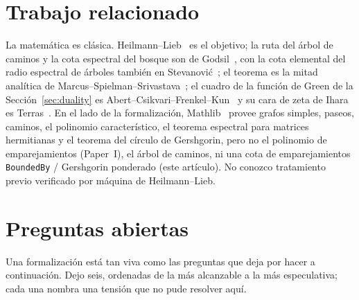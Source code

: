 \documentclass[11pt]{article}
\newcommand{\lean}[1]{{\def\_{\textunderscore\allowbreak}\texttt{#1}}}
\begin{document}
\section{Trabajo relacionado}
\label{sec:related}

La matem\'atica es cl\'asica. Heilmann--Lieb~\cite{HeilmannLieb1972} es el objetivo;
la ruta del \'arbol de caminos y la cota espectral del bosque son de
Godsil~\cite{Godsil1981Matchings,Godsil1993}, con la cota elemental del radio
espectral de \'arboles tambi\'en en Stevanovi\'c~\cite{Stevanovic2003}; el teorema
es la mitad anal\'itica de Marcus--Spielman--Srivastava~\cite{MSS2015a}; el cuadro de
la funci\'on de Green de la Secci\'on~\ref{sec:duality} es
Abert--Csikvari--Frenkel--Kun~\cite{AbertCsikvariFrenkelKun2016} y su cara de zeta de
Ihara es Terras~\cite{Terras2011}. En el lado de la formalizaci\'on,
Mathlib~\cite{Mathlib2020} provee grafos simples, paseos, caminos, el polinomio
caracter\'istico, el teorema espectral para matrices hermitianas y el teorema del
c\'irculo de Gershgorin, pero no el polinomio de emparejamientos (Paper~I), el
\'arbol de caminos, ni una cota de emparejamientos \lean{BoundedBy} / Gershgorin
ponderado (este art\'iculo). No conozco tratamiento previo verificado por m\'aquina
de Heilmann--Lieb.

\section{Preguntas abiertas}
\label{sec:open}

Una formalizaci\'on est\'a tan viva como las preguntas que deja por hacer a
continuaci\'on. Dejo seis, ordenadas de la m\'as alcanzable a la m\'as especulativa;
cada una nombra una tensi\'on que no pude resolver aqu\'i.
\end{document}
